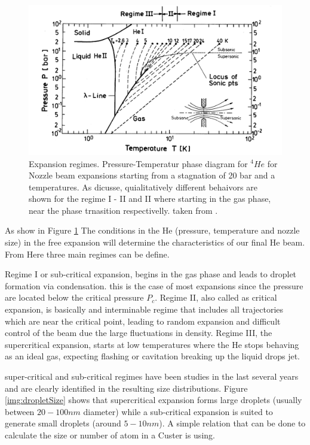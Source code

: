 \begin{figure}[hbtp] \label{fig:ExpRegim}
\centering
\includegraphics[width= 13 cm]{../Images/expansion_regimes.PNG}
\caption[Phase diagram for Expantion regimens]{Expansion regimes. Pressure-Temperatur phase diagram for $^{4}He$ for Nozzle beam expansions starting from a stagnation of 20 bar and a temperatures. As dicusse, quialitatively different behaivors are shown for the regime I - II and II where  starting in the gas phase,  near the phase trnasition respectivelly. taken from \cite{buchenau_mass_1990}. }
\end{figure}

As show in Figure \ref{fig:ExpRegim} The conditions in the He (pressure, temperature and nozzle size) in the free expansion will determine the characteristics of our final He beam. From Here three main regimes can be define.

Regime I or sub-critical expansion, begins in the gas phase and leads to droplet formation via condensation. this is the case of most expansions since the pressure are located below the critical pressure $P_{c}$.
Regime II, also called as critical expansion, is basically  and interminable regime that includes all trajectories which are near the critical point, leading to random expansion and difficult control of the beam due the large fluctuations in density.
Regime III, the  supercritical expansion, starts at low temperatures where the He stops behaving as an ideal gas, expecting flashing or cavitation  breaking up the liquid drops jet. \cite{buchenau_mass_1990}

super-critical and sub-critical regimes have been studies  in the last several years and  are clearly identified in the resulting size distributions. Figure \ref{img:dropletSize} shows that supercritical expansion forms large droplets (usually between $20-100 nm$ diameter) while a sub-critical expansion is suited to generate small droplets (around $5-10 nm$).  A simple relation that can be done to calculate the size or number of atom in a Custer is using. 

